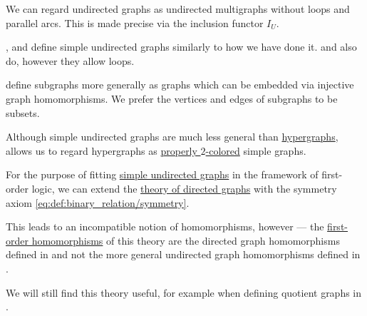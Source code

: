 \begin{comments}
  \item We can regard undirected graphs as undirected multigraphs without loops and parallel arcs. This is made precise via the inclusion functor \hyperref[def:graph_functors/undirected_inclusion]{\( I_U \)}.

  \item {},  and  define simple undirected graphs similarly to how we have done it.  and  also do, however they allow loops.

  \item {} define subgraphs more generally as graphs which can be embedded via injective graph homomorphisms. We prefer the vertices and edges of subgraphs to be subsets.

  \item Although simple undirected graphs are much less general than \hyperref[def:hypergraph]{hypergraphs},  allows us to regard hypergraphs as \hyperref[def:graph_coloring/proper]{properly \( 2 \)-colored} simple graphs.
\end{comments}

\begin{remark}\label{rem:theory_of_simple_undirected_graphs}
  For the purpose of fitting \hyperref[def:undirected_graph]{simple undirected graphs} in the framework of first-order logic, we can extend the \hyperref[def:directed_graph/theory]{theory of directed graphs} with the symmetry axiom \eqref{eq:def:binary_relation/symmetry}.

  This leads to an incompatible notion of homomorphisms, however --- the \hyperref[def:first_order_homomorphism]{first-order homomorphisms} of this theory are the directed graph homomorphisms defined in  and not the more general undirected graph homomorphisms defined in .

  We will still find this theory useful, for example when defining quotient graphs in .
\end{remark}

